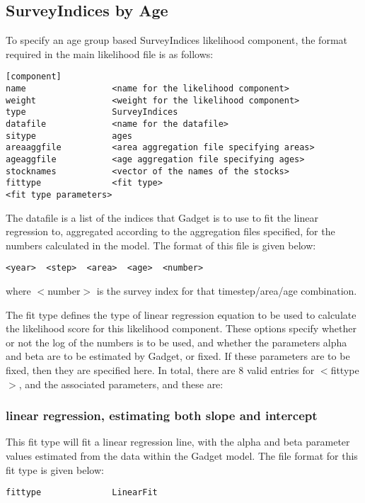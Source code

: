 \documentclass [a4paper, 10pt]{book}
\begin{document}
\subsection{SurveyIndices by Age}\label{subsec:sibyage}
To specify an age group based SurveyIndices likelihood component, the format required in the main likelihood file is as follows:

\begin{verbatim}
[component]
name                 <name for the likelihood component>
weight               <weight for the likelihood component>
type                 SurveyIndices
datafile             <name for the datafile>
sitype               ages
areaaggfile          <area aggregation file specifying areas>
ageaggfile           <age aggregation file specifying ages>
stocknames           <vector of the names of the stocks>
fittype              <fit type>
<fit type parameters>
\end{verbatim}

The datafile is a list of the indices that Gadget is to use to fit the linear regression to, aggregated according to the aggregation files specified, for the numbers calculated in the model.  The format of this file is given below:

\begin{verbatim}
<year>  <step>  <area>  <age>  <number>
\end{verbatim}

where $<$number$>$ is the survey index for that timestep/area/age combination.

\bigskip
The fit type defines the type of linear regression equation to be used to calculate the likelihood score for this likelihood component.  These options specify whether or not the log of the numbers is to be used, and whether the parameters alpha and beta are to be estimated by Gadget, or fixed.  If these parameters are to be fixed, then they are specified here.  In total, there are 8 valid entries for $<$fittype$>$, and the associated parameters, and these are:

\subsubsection{linear regression, estimating both slope and intercept}
This fit type will fit a linear regression line, with the alpha and beta parameter values estimated from the data within the Gadget model.  The file format for this fit type is given below:
\begin{verbatim}
fittype              LinearFit
\end{verbatim}
\end{document}
